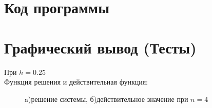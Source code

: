 \documentclass[12pt,a4paper]{scrartcl}
\begin{document}
\section{Код программы}



\section{Графический вывод (Тесты)}
При $h = 0.25$ \\
Функция решения и действительная функция:
\begin{figure}[h]
	\begin{minipage}[h]{0.49\linewidth}
	\end{minipage}
	\hfill
	\begin{minipage}[h]{0.49\linewidth}
	\end{minipage}
	\caption{a)решение системы, б)действительное значение при $n=4$}
	\label{ris:image1}
\end{figure}
\end{document}
